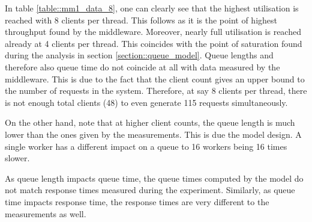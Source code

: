 \documentclass[11pt,a4paper]{article}
\begin{document}
In table \ref{table::mm1_data_8}, one can clearly see that the highest utilisation is reached with 8 clients per thread. This follows as it is the point of highest throughput found by the middleware. Moreover, nearly full utilisation is reached already at 4 clients per thread. This coincides with the point of saturation found during the analysis in section \ref{section::queue_model}. Queue lengths and therefore also queue time do not coincide at all with data measured by the middleware. This is due to the fact that the client count gives an upper bound to the number of requests in the system. Therefore, at say 8 clients per thread, there is not enough total clients (48) to even generate 115 requests simultaneously.

On the other hand, note that at higher client counts, the queue length is much lower than the ones given by the measurements. This is due the model design. A single worker has a different impact on a queue to 16 workers being 16 times slower.

As queue length impacts queue time, the queue times computed by the model do not match response times measured during the experiment. Similarly, as queue time impacts response time, the response times are very different to the measurements as well.
\end{document}
